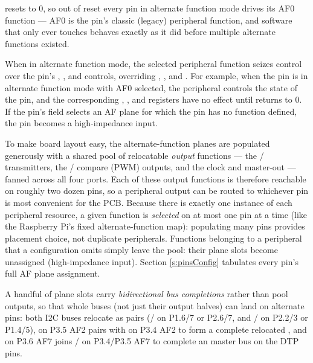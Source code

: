  resets to 0, so out of reset every pin in alternate function mode drives its AF0 function --- AF0 is the pin's classic (legacy) peripheral function, and software that only ever touches  behaves exactly as it did before multiple alternate functions existed.

When in alternate function mode, the selected peripheral function seizes control over the pin's , , and  controls, overriding , , and . For example, when the  pin is in alternate function mode with AF0 selected, the  peripheral controls the state of the pin, and the corresponding , , and  registers have no effect until  returns to 0. If the pin's  field selects an AF plane for which the pin has no function defined, the pin becomes a high-impedance input.

To make board layout easy, the alternate-function planes are populated generously with a shared pool of relocatable \emph{output} functions --- the / transmitters, the / compare (PWM) outputs, and the  clock and master-out --- fanned across all four ports. Each of these output functions is therefore reachable on roughly two dozen pins, so a peripheral output can be routed to whichever pin is most convenient for the PCB. Because there is exactly one instance of each peripheral resource, a given function is \emph{selected} on at most one pin at a time (like the Raspberry Pi's fixed alternate-function map): populating many pins provides placement choice, not duplicate peripherals. Functions belonging to a peripheral that a configuration omits simply leave the pool: their plane slots become unassigned (high-impedance input). Section \ref{s:pinsConfig} tabulates every pin's full AF plane assignment.

A handful of plane slots carry \emph{bidirectional bus completions} rather than pool outputs, so that whole buses (not just their output halves) can land on alternate pins: both I2C buses relocate as pairs (/ on P1.6/7 or P2.6/7, and / on P2.2/3 or P1.4/5),  on P3.5 AF2 pairs with  on P3.4 AF2 to form a complete relocated , and  on P3.6 AF7 joins / on P3.4/P3.5 AF7 to complete an  master bus on the DTP pins.

